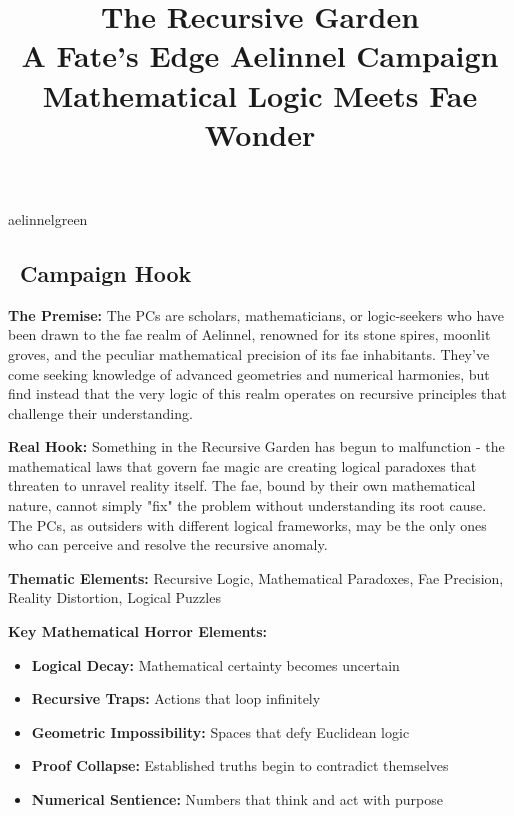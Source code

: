 \documentclass[11pt]{article}
\title{\Huge\textbf{The Recursive Garden}\\
\Large A Fate's Edge Aelinnel Campaign\\
\large Mathematical Logic Meets Fae Wonder}
\author{}
\date{}
\begin{document}
\maketitle

\begin{center}
\end{center}

\begin{campaignsection}{aelinnelgreen}
\subsection*{\faMap\ Campaign Hook}

\textbf{The Premise:} The PCs are scholars, mathematicians, or logic-seekers who have been drawn to the fae realm of Aelinnel, renowned for its stone spires, moonlit groves, and the peculiar mathematical precision of its fae inhabitants. They've come seeking knowledge of advanced geometries and numerical harmonies, but find instead that the very logic of this realm operates on recursive principles that challenge their understanding.

\textbf{Real Hook:} Something in the Recursive Garden has begun to malfunction - the mathematical laws that govern fae magic are creating logical paradoxes that threaten to unravel reality itself. The fae, bound by their own mathematical nature, cannot simply "fix" the problem without understanding its root cause. The PCs, as outsiders with different logical frameworks, may be the only ones who can perceive and resolve the recursive anomaly.

\textbf{Thematic Elements:} Recursive Logic, Mathematical Paradoxes, Fae Precision, Reality Distortion, Logical Puzzles

\textbf{Key Mathematical Horror Elements:}
\begin{itemize}
    \item \textbf{Logical Decay:} Mathematical certainty becomes uncertain
    \item \textbf{Recursive Traps:} Actions that loop infinitely
    \item \textbf{Geometric Impossibility:} Spaces that defy Euclidean logic
    \item \textbf{Proof Collapse:} Established truths begin to contradict themselves
    \item \textbf{Numerical Sentience:} Numbers that think and act with purpose
\end{itemize}
\end{campaignsection}
\end{document}
